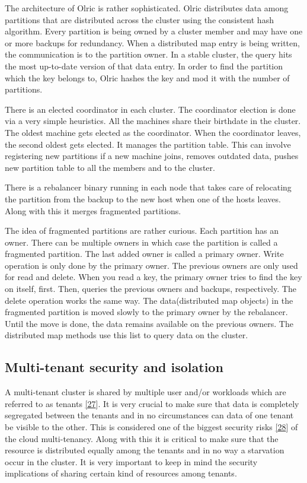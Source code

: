 \documentclass[12pt,titlepage]{article}
\begin{document}
The architecture of Olric is rather sophisticated. Olric distributes data among
partitions that are distributed across the cluster using the consistent hash algorithm. Every partition is being
owned by a cluster member and may have one or more backups for redundancy. When
a distributed map entry is being written, the communication is to the partition
owner. In a stable cluster, the query hits the most up-to-date version of that
data entry. In order to find the partition which the key belongs to, Olric
hashes the key and mod it with the number of partitions.

There is an elected coordinator in each cluster. The coordinator election is
done via a very simple heuristics. All the machines share their birthdate in the
cluster. The oldest machine gets elected as the coordinator. When the
coordinator leaves, the second oldest gets elected. It manages the partition table.
This can involve registering new partitions if a new machine joins, removes
outdated data, pushes new partition table to all the members and to the cluster.

There is a rebalancer binary running in each node that takes care of relocating
the partition from the backup to the new host when one of the hosts leaves.
Along with this it merges fragmented partitions.

The idea of fragmented partitions are rather curious. Each partition has an
owner. There can be multiple owners in which case the partition is called a
fragmented partition. The last added owner is called a primary owner. Write
operation is only done by the primary owner. The previous owners are only used
for read and delete. When you read a key, the primary owner tries to find the
key on itself, first. Then, queries the previous owners and backups,
respectively. The delete operation works the same way. The data(distributed map
objects) in the fragmented partition is moved slowly to the primary owner by the
rebalancer. Until the move is done, the data remains available on the previous
owners. The distributed map methods use this list to query data on the cluster.


\subsection{Multi-tenant security and isolation}
\label{sec:org189ad16}
A multi-tenant cluster is shared by multiple user and/or workloads which are
referred to as tenants \hyperref[ref:27]{[27}]. It is very crucial to make sure that data is
completely segregated between the tenants and in no circumstances can data of
one tenant be visible to the other. This is considered one of the biggest
security risks \hyperref[ref:28]{[28}] of the cloud multi-tenancy. Along with this it is
critical to make sure that the resource is distributed equally among the tenants
and in no way a starvation occur in the cluster. It is very important to keep in
mind the security implications of sharing certain kind of resources among
tenants.
\end{document}

